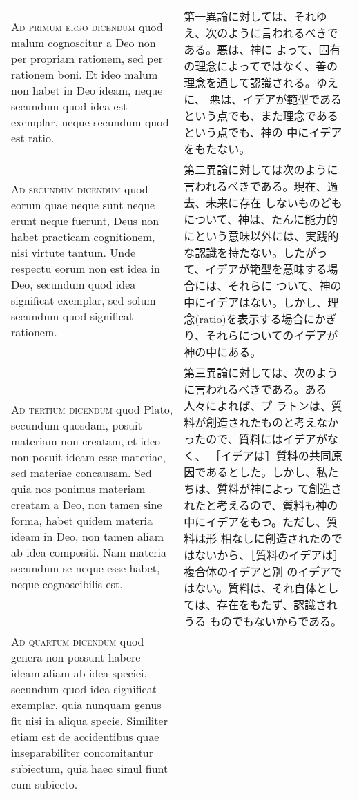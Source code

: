 \documentclass[10pt]{jsarticle} %
\begin{document}
\begin{longtable}{p{21em}p{21em}}
{\scshape Ad primum ergo dicendum} quod malum cognoscitur a Deo non
per propriam rationem, sed per rationem boni. Et ideo malum non habet
in Deo ideam, neque secundum quod idea est exemplar, neque secundum
quod est ratio.


&

第一異論に対しては、それゆえ、次のように言われるべきである。悪は、神に
よって、固有の理念によってではなく、善の理念を通して認識される。ゆえに、
悪は、イデアが範型であるという点でも、また理念であるという点でも、神の
中にイデアをもたない。

\\


{\scshape Ad secundum dicendum} quod eorum quae neque sunt neque erunt
neque fuerunt, Deus non habet practicam cognitionem, nisi virtute
tantum. Unde respectu eorum non est idea in Deo, secundum quod idea
significat exemplar, sed solum secundum quod significat rationem.

&

第二異論に対しては次のように言われるべきである。現在、過去、未来に存在
しないものどもについて、神は、たんに能力的にという意味以外には、実践的
な認識を持たない。したがって、イデアが範型を意味する場合には、それらに
ついて、神の中にイデアはない。しかし、理念(ratio)を表示する場合にかぎ
り、それらについてのイデアが神の中にある。

\\


{\scshape Ad tertium dicendum} quod Plato, secundum quosdam, posuit
materiam non creatam, et ideo non posuit ideam esse materiae, sed
materiae concausam. Sed quia nos ponimus materiam creatam a Deo, non
tamen sine forma, habet quidem materia ideam in Deo, non tamen aliam
ab idea compositi. Nam materia secundum se neque esse habet, neque
cognoscibilis est.

&

第三異論に対しては、次のように言われるべきである。ある人々によれば、プ
ラトンは、質料が創造されたものと考えなかったので、質料にはイデアがなく、
［イデアは］質料の共同原因であるとした。しかし、私たちは、質料が神によっ
て創造されたと考えるので、質料も神の中にイデアをもつ。ただし、質料は形
相なしに創造されたのではないから、［質料のイデアは］複合体のイデアと別
のイデアではない。質料は、それ自体としては、存在をもたず、認識されうる
ものでもないからである。

\\


{\scshape Ad quartum dicendum} quod genera non possunt habere ideam
aliam ab idea speciei, secundum quod idea significat exemplar, quia
nunquam genus fit nisi in aliqua specie. Similiter etiam est de
accidentibus quae inseparabiliter concomitantur subiectum, quia haec
simul fiunt cum subiecto.


\end{longtable}
\end{document}
